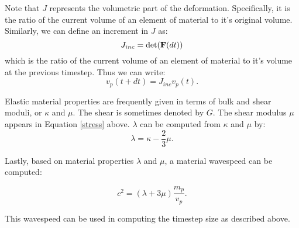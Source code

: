 Note that $J$ represents the volumetric part of the deformation.  
Specifically, it is the ratio of the current volume of an 
element of material to it's original volume.  Similarly, we can
define an increment in $J$ as:
\begin{equation}
	J_{inc} = \det(\mbox{\ensuremath{\mathbf{F}}}(dt))
\end{equation}
which  is the ratio of the current volume of an element of 
material to it's volume at the previous timestep.  Thus we can 
write:
\begin{equation}
	v_p(t+dt) = J_{inc} v_p(t).
\end{equation}

Elastic material properties are frequently given in terms of 
bulk and shear moduli, or $\kappa$ and $\mu$.  The shear is 
sometimes denoted by $G$.  The shear modulus $\mu$ appears in 
Equation \ref{stress} above.  $\lambda$ can be computed from
$\kappa$ and $\mu$ by:
\begin{equation}
	\lambda = \kappa - \frac{2}{3}\mu.
\end{equation}

Lastly, based on material properties $\lambda$ and $\mu$, a material 
wavespeed can be computed:

\begin{equation}
	c^2 = (\lambda + 3 \mu)\frac{m_p}{v_p}.
\end{equation}

This wavespeed can be used in computing the timestep size as 
described above.

